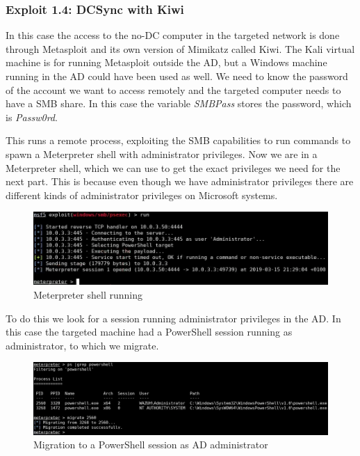\subsubsection{Exploit 1.4: DCSync with Kiwi}
In this case the access to the no-DC computer in the targeted network is done through Metasploit\cite{metasploit} and its own version of Mimikatz called Kiwi\cite{pentestlab}. The Kali virtual machine is for running Metasploit outside the AD, but a Windows machine running in the AD could have been used as well.
\linej
We need to know the password of the account we want to access remotely and the targeted computer needs to have a SMB share.
In this case the variable \textit{SMBPass} stores the password, which is \textit{Passw0rd}.
\linej

\linej
This runs a remote process, exploiting the SMB capabilities to run commands to spawn a Meterpreter shell\cite{meterpreter} with administrator privileges.
\linej
\linej
Now we are in a Meterpreter shell, which we can use to get the exact privileges we need for the next part. This is because even though we have administrator privileges there are different kinds of administrator privileges on Microsoft systems.
\begin{figure}[H]
	\centering
	\includegraphics[width=\textwidth]{figuras/meterpreter.png}
	\caption{Meterpreter shell running}
\end{figure}
\linej
To do this we look for a session running administrator privileges in the AD. In this case the targeted machine had a PowerShell session running as administrator, to which we migrate.
\linej
\begin{figure}[H]
	\centering
	\includegraphics[width=\textwidth]{figuras/migrate.png}
	\caption{Migration to a PowerShell session as AD administrator}
\end{figure}
